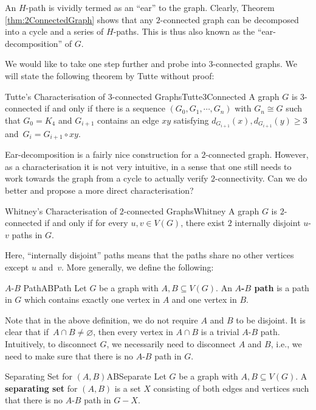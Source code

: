 \documentclass[math]{amznotes}
\theoremstyle{remark}
\begin{document}
An $H$-path is vividly termed as an ``ear'' to the graph. Clearly, Theorem \ref{thm:2ConnectedGraph} shows that any $2$-connected graph can be decomposed into a cycle and a series of $H$-paths. This is thus also known as the ``ear-decomposition'' of $G$.

We would like to take one step further and probe into $3$-connected graphs. We will state the following theorem by Tutte without proof:
\begin{thmbox}{Tutte's Characterisation of $3$-connected Graphs}{Tutte3Connected}
    A graph $G$ is $3$-connected if and only if there is a sequence $\left(G_0, G_1, \cdots, G_n\right)$ with $G_n \cong G$ such that $G_0 = K_4$ and $G_{i + 1}$ contains an edge $xy$ satisfying $d_{G_{i + 1}}(x), d_{G_{i + 1}}(y) \geq 3$ and~$G_i = G_{i + 1} \circ xy$. 
\end{thmbox}
Ear-decomposition is a fairly nice construction for a $2$-connected graph. However, as a characterisation it is not very intuitive, in a sense that one still needs to work towards the graph from a cycle to actually verify $2$-connectivity. Can we do better and propose a more direct characterisation?
\begin{thmbox}{Whitney's Characterisation of $2$-connected Graphs}{Whitney}
    A graph $G$ is $2$-connected if and only if for every $u, v \in V(G)$, there exist $2$ internally disjoint $u$-$v$ paths in $G$.
\end{thmbox}
Here, ``internally disjoint'' paths means that the paths share no other vertices except $u$ and~$v$. More generally, we define the following:
\begin{dfnbox}{$A$-$B$ Path}{ABPath}
    Let $G$ be a graph with $A, B \subseteq V(G)$. An {\color{red} \textbf{$A$-$B$ path}} is a path in $G$ which contains exactly one vertex in $A$ and one vertex in $B$.
\end{dfnbox} 
Note that in the above definition, we do not require $A$ and $B$ to be disjoint. It is clear that if~$A \cap B \neq \varnothing$, then every vertex in $A \cap B$ is a trivial $A$-$B$ path. Intuitively, to disconnect $G$, we necessarily need to disconnect $A$ and $B$, i.e., we need to make sure that there is no $A$-$B$ path in $G$.
\begin{dfnbox}{Separating Set for $(A, B)$}{ABSeparate}
    Let $G$ be a graph with $A, B \subseteq V(G)$. A {\color{red} \textbf{separating set}} for $(A, B)$ is a set $X$ consisting of both edges and vertices such that there is no $A$-$B$ path in $G - X$.
\end{dfnbox}
\end{document}
